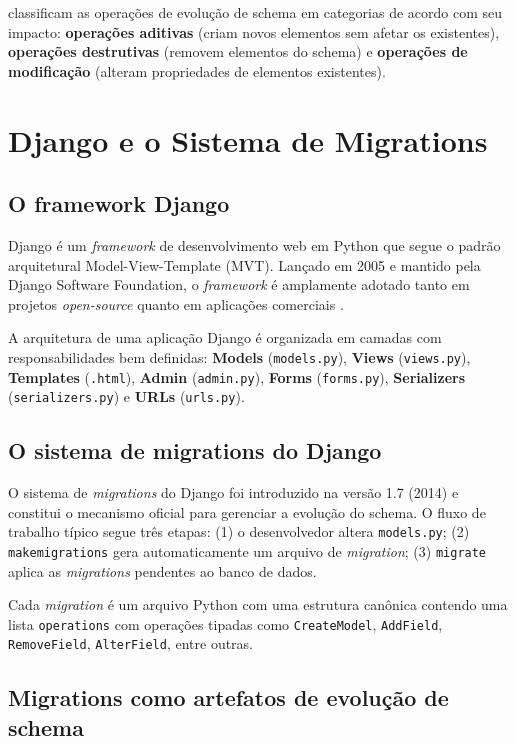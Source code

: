 \documentclass[
  12pt,
  openright,
  oneside,
  a4paper,
  brazil
]{abntex2}
\begin{document}
 classificam as operações de evolução de schema em categorias de acordo com seu impacto: \textbf{operações aditivas} (criam novos elementos sem afetar os existentes), \textbf{operações destrutivas} (removem elementos do schema) e \textbf{operações de modificação} (alteram propriedades de elementos existentes).

\section{Django e o Sistema de Migrations}

\subsection{O framework Django}

Django é um \textit{framework} de desenvolvimento web em Python que segue o padrão arquitetural Model-View-Template (MVT). Lançado em 2005 e mantido pela Django Software Foundation, o \textit{framework} é amplamente adotado tanto em projetos \textit{open-source} quanto em aplicações comerciais \cite{djangodocs2024}.

A arquitetura de uma aplicação Django é organizada em camadas com responsabilidades bem definidas: \textbf{Models} (\texttt{models.py}), \textbf{Views} (\texttt{views.py}), \textbf{Templates} (\texttt{.html}), \textbf{Admin} (\texttt{admin.py}), \textbf{Forms} (\texttt{forms.py}), \textbf{Serializers} (\texttt{serializers.py}) e \textbf{URLs} (\texttt{urls.py}).

\subsection{O sistema de migrations do Django}

O sistema de \textit{migrations} do Django foi introduzido na versão 1.7 (2014) e constitui o mecanismo oficial para gerenciar a evolução do schema. O fluxo de trabalho típico segue três etapas: (1) o desenvolvedor altera \texttt{models.py}; (2) \texttt{makemigrations} gera automaticamente um arquivo de \textit{migration}; (3) \texttt{migrate} aplica as \textit{migrations} pendentes ao banco de dados.

Cada \textit{migration} é um arquivo Python com uma estrutura canônica contendo uma lista \texttt{operations} com operações tipadas como \texttt{CreateModel}, \texttt{AddField}, \texttt{RemoveField}, \texttt{AlterField}, entre outras.

\subsection{Migrations como artefatos de evolução de schema}
\end{document}
